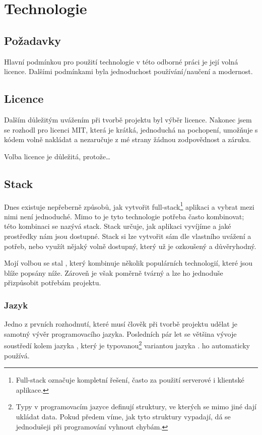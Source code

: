 \hypertarget{Technologie}{\chapter{Technologie}}

\section{Požadavky}

Hlavní podmínkou pro použití technologie v této odborné práci je její volná licence. Dalšími podmínkami byla jednoduchost používání/naučení a modernost.

\section{Licence}

Dalším důležitým uvážením při tvorbě projektu byl výběr licence. Nakonec jsem se rozhodl pro licenci MIT, která je krátká, jednoduchá na pochopení, umožňuje s kódem volně nakládat a nezaručuje z mé strany žádnou zodpovědnost a záruku.\cite{choosealicense}

Volba licence je důležitá, protože\dots

\section{Stack}

Dnes existuje nepřeberně způsobů, jak vytvořit full-stack\footnote{Full-stack označuje kompletní řešení, často za použití serverové i klientské aplikace.} aplikaci a vybrat mezi nimi není jednoduché. Mimo to je tyto technologie potřeba často kombinovat; této kombinaci se nazývá stack. Stack určuje, jak aplikaci vyvíjíme a jaké prostředky nám jsou dostupné. Stack si lze vytvořit sám dle vlastního uvážení a potřeb, nebo využít nějaký volně dostupný, který už je ozkoušený a důvěryhodný.

Mojí volbou se stal , který kombinuje několik populárních technologií, které jsou blíže popsány níže. Zároveň je však poměrně tvárný a lze ho jednoduše přizpůsobit potřebám projektu.

\subsection{Jazyk}

Jedno z prvních rozhodnutí, které musí člověk při tvorbě projektu udělat je samotný vývěr programovacího jazyka. Posledních pár let se většina vývoje soustředí kolem jazyka , který je typovanou\footnote{Typy v programovacím jazyce definují struktury, ve kterých se mimo jiné dají ukládat data. Pokud předem víme, jak tyto struktury vypadají, dá se jednodušeji při programování vyhnout chybám.} variantou jazyka .  ho automaticky používá. 

